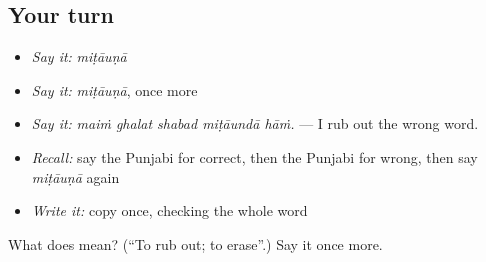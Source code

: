 \subsection*{Your turn}
\begin{itemize}
\raggedright
  \item \emph{Say it:} \emph{miṭāuṇā}
  \item \emph{Say it:} \emph{miṭāuṇā}, once more
  \item \emph{Say it:} \emph{maiṁ ghalat shabad miṭāundā hāṁ.} — I rub out the wrong word.
  \item \emph{Recall:} say the Punjabi for correct, then the Punjabi for wrong, then say \emph{miṭāuṇā} again
  \item \emph{Write it:} copy \textbf{} once, checking the whole word
\end{itemize}

\begin{tcolorbox}[breakable,colback=teal!4,colframe=teal!35!black,title={Before you move on}]
What does  mean? (\textquotedblleft{}To rub out; to erase\textquotedblright{}.) Say it once more.
\end{tcolorbox}
